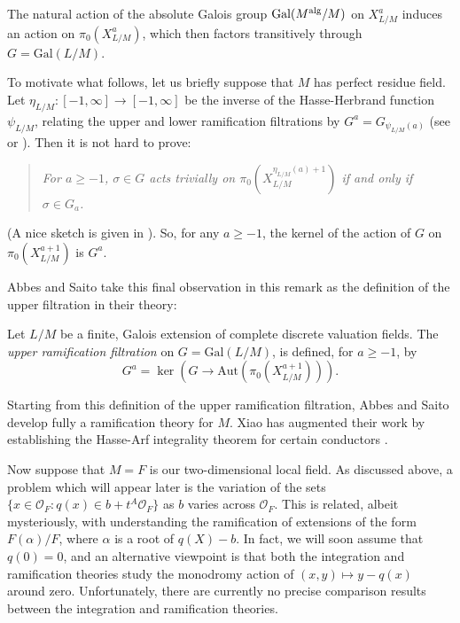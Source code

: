 \documentclass{lmsMODIFIED}
\newcommand{\roi}{\mathcal{O}}
\newcommand{\al}{\alpha}
\newcommand{\sub}[1]{{\mbox{\scriptsize {#1}}}}
\begin{document}
The natural action of the absolute Galois group $\mbox{Gal}(M^\sub{alg}/M)$ on $X_{L/M}^a$ induces an action on $\pi_0(X_{L/M}^a)$, which then factors transitively through $G=\mbox{Gal}(L/M)$.

\begin{remark}\label{remark_ramification_theory_in_perfect_case}
To motivate what follows, let us briefly suppose that $M$ has perfect residue field. Let $\eta_{L/M}:[-1,\infty]\to[-1,\infty]$ be the inverse of the Hasse-Herbrand function $\psi_{L/M}$, relating the upper and lower ramification filtrations by $G^a=G_{\psi_{L/M}(a)}$ (see \cite{Fesenko2002} or \cite{Neukirch1999}). Then it is not hard to prove: \begin{quote}{\em For $a\ge -1$, $\sigma\in G$ acts trivially on $\pi_0(X_{L/M}^{\eta_{L/M}(a)+1})$ if and only if $\sigma\in G_a$.}\end{quote} (A nice sketch is given in \cite{Xiao2007}). So, for any $a\ge -1$, the kernel of the action of $G$ on $\pi_0(X_{L/M}^{a+1})$ is $G^a$.
\end{remark}

Abbes and Saito take this final observation in this remark as the definition of the upper filtration in their theory:

\begin{definition}
Let $L/M$ be a finite, Galois extension of complete discrete valuation fields. The {\em upper ramification filtration} on $G=\mbox{Gal}(L/M)$, is defined, for $a\ge -1$, by \[G^a=\ker(G\to\mbox{Aut}(\pi_0(X_{L/M}^{a+1}))).\]
\end{definition}

Starting from this definition of the upper ramification filtration, Abbes and Saito develop fully a ramification theory for $M$. Xiao has augmented their work by establishing the Hasse-Arf integrality theorem for certain conductors \cite{Xiao2008a} \cite{Xiao2008b}.

Now suppose that $M=F$ is our two-dimensional local field. As discussed above, a problem which will appear later is the variation of the sets $\{x\in\roi_{F}:q(x)\in b+t^A\roi_{F}\}$ as $b$ varies across $\roi_F$. This is related, albeit mysteriously, with understanding the ramification of extensions of the form $F(\al)/F$, where $\al$ is a root of $q(X)-b$. In fact, we will soon assume that $q(0)=0$, and an alternative viewpoint is that both the integration and ramification theories study the monodromy action of $(x,y)\mapsto y-q(x)$ around zero. Unfortunately, there are currently no precise comparison results between the integration and ramification theories.
\end{document}
